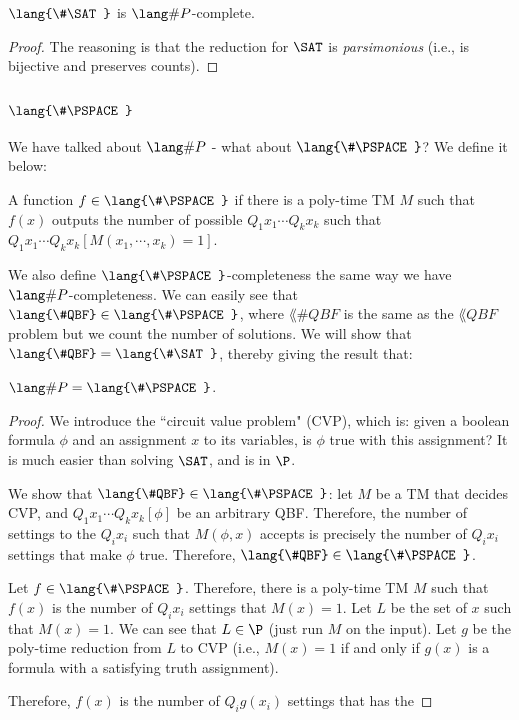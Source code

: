 \newcommand{\SharpSAT}{\lang{\#\SAT}}
\begin{theorem}
$\SharpSAT$ is $\SharpP$-complete.
\end{theorem}

\begin{proof}
The reasoning is that the reduction for $\SAT$ is \emph{parsimonious} (i.e., is bijective and preserves counts). 
\end{proof}

\newcommand{\SharpPSPACE}{\lang{\#\PSPACE}}
\subsection{$\SharpPSPACE$}
We have talked about $\SharpP$ - what about $\SharpPSPACE$? We define it below:
\begin{definition}
A function $f \in \SharpPSPACE$ if there is a poly-time TM $M$ such that $f(x)$ outputs the number of possible $Q_1x_1 \cdots Q_kx_k$ such that $Q_1x_1 \cdots Q_kx_k [M(x_1, \cdots, x_k) = 1]$. 
\end{definition}
\newcommand{\SharpQBF}{\lang{\#QBF}}
We also define $\SharpPSPACE$-completeness the same way we have $\SharpP$-completeness. We can easily see that $\SharpQBF \in \SharpPSPACE$, where $\SharpQBF$ is the same as the $\lang{QBF}$ problem but we count the number of solutions. We will show that $\SharpQBF = \SharpSAT$, thereby giving the result that:
\begin{theorem}
$\SharpP = \SharpPSPACE$.
\end{theorem}

\begin{proof}
We introduce the ``circuit value problem" (CVP), which is: given a boolean formula $\phi$ and an assignment $x$ to its variables, is $\phi$ true with this assignment? It is much easier than solving $\SAT$, and is in $\P$. 

\par We show that $\SharpQBF \in \SharpPSPACE$: let $M$ be a TM that decides CVP, and $Q_1x_1 \cdots Q_kx_k [\phi]$ be an arbitrary QBF. Therefore, the number of settings to the $Q_ix_i$ such that $M(\phi, x)$ accepts is precisely the number of $Q_ix_i$ settings that make $\phi$ true. Therefore, $\SharpQBF \in \SharpPSPACE$.

\par Let $f \in \SharpPSPACE$. Therefore, there is a poly-time TM $M$ such that $f(x)$ is the number of $Q_ix_i$ settings that $M(x) = 1$. Let $L$ be the set of $x$ such that $M(x) = 1$. We can see that $L \in \P$ (just run $M$ on the input). Let $g$ be the poly-time reduction from $L$ to CVP (i.e., $M(x) = 1$ if and only if $g(x)$ is a formula with a satisfying truth assignment). 

\par Therefore, $f(x)$ is the number of $Q_ig(x_i)$ settings that has the 
\end{proof}

